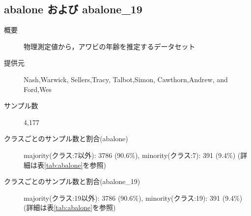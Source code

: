 \subsection{abalone および abalone\_19}
\begin{description}
    \item[概要] 物理測定値から，アワビの年齢を推定するデータセット \cite{abalone}
    \item[提供元] Nash,Warwick, Sellers,Tracy, Talbot,Simon, Cawthorn,Andrew, and Ford,Wes
    \item[サンプル数] 4,177
    \item[クラスごとのサンプル数と割合(abalone)] majority(クラス:7以外): 3786 (90.6\%), minority(クラス:7): 391 (9.4\%) (詳細は表\ref{tab:abalone}を参照)
    \item[クラスごとのサンプル数と割合(abalone\_19)] majority(クラス:19以外): 3786 (90.6\%), minority(クラス:19): 391 (9.4\%) (詳細は表\ref{tab:abalone}を参照)


\end{description}
